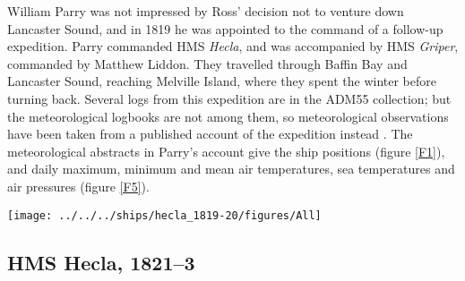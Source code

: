 \documentclass[CP]{copernicus}
\begin{document}
William Parry was not impressed by Ross' decision not to venture down Lancaster Sound, and in 1819 he was appointed to the command of a follow-up expedition. Parry commanded HMS {\it Hecla}, and was accompanied by HMS {\it Griper}, commanded by Matthew Liddon. They travelled through Baffin Bay and Lancaster Sound, reaching Melville Island, where they spent the winter before turning back. Several logs from this expedition are in the ADM55 collection; but the meteorological logbooks are not among them, so meteorological observations have been taken from a published account of the expedition instead \citep{parry_1819}. The meteorological abstracts in Parry's account give the ship positions (figure \ref{F1}), and daily maximum, minimum and mean air temperatures, sea temperatures and air pressures (figure \ref{F5}). 
\begin{figure*}[!hbp]
\begin{center}
\texttt{[image: ../../../ships/hecla\_1819-20/figures/All]}
\caption{Weather observations from HMS {\it Hecla} in 1819--20, compared with modern values. The red points are the expedition's observations, the black and grey lines are the mean, max and min values from modern datasets (monthly averages interpolated to daily, 1979-2004; SST and sea-ice from \citet{rayner03HadISST1}, AT from \citet{rigor97poles}, and pressure from \citet{allan06meansealevelpressure}). The grey band marks the period the expedition spent in winter harbour.}
\label{F5}
\end{center}
\end{figure*}

\subsection{HMS Hecla, 1821--3}
\end{document}
